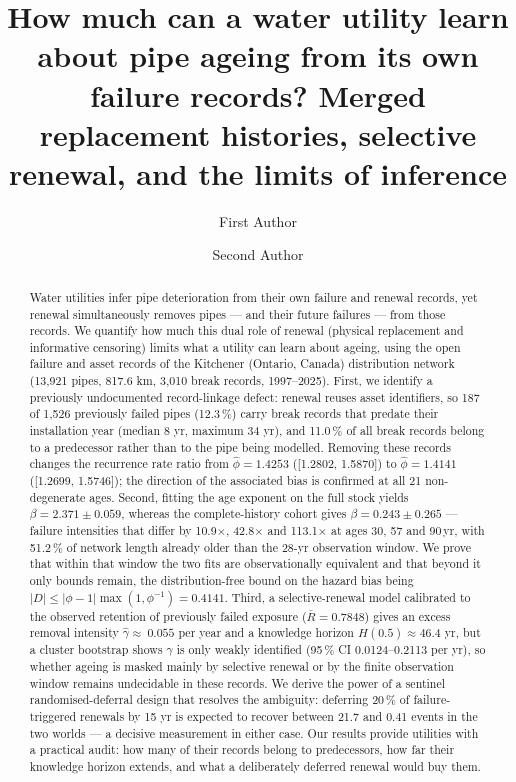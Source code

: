 \documentclass[review,12pt,authoryear]{elsarticle}
\begin{document}
\begin{frontmatter}

\title{How much can a water utility learn about pipe ageing from its own
failure records? Merged replacement histories, selective renewal, and the
limits of inference}

\author[a]{First Author}
\author[b]{Second Author}

\begin{abstract}
Water utilities infer pipe deterioration from their own failure and renewal
records, yet renewal simultaneously removes pipes --- and their future
failures --- from those records. We quantify how much this dual role of
renewal (physical replacement and informative censoring) limits what a
utility can learn about ageing, using the open failure and asset records of
the Kitchener (Ontario, Canada) distribution network (13,921 pipes,
817.6 km, 3,010 break records, 1997--2025). First, we identify a
previously undocumented record-linkage defect: renewal reuses asset
identifiers, so 187 of 1,526 previously failed pipes
(12.3\,\%) carry break records that predate their installation year
(median 8 yr, maximum 34 yr), and 11.0\,\% of all
break records belong to a predecessor rather than to the pipe being modelled.
Removing these records changes the recurrence rate ratio from
$\hat\phi = 1.4253$ ([1.2802, 1.5870]) to $\hat\phi = 1.4141$ ([1.2699, 1.5746]);
the direction of the associated bias is confirmed at all 21
non-degenerate ages. Second, fitting the age exponent on the full stock
yields $\beta = 2.371 \pm 0.059$, whereas the complete-history cohort
gives $\beta = 0.243 \pm 0.265$ --- failure intensities that differ by
10.9$\times$, 42.8$\times$ and 113.1$\times$ at ages 30, 57 and
90\,yr, with 51.2\,\% of network length already older than the 28-yr
observation window. We prove that within that window the two fits are
observationally equivalent and that beyond it only bounds remain, the
distribution-free bound on the hazard bias being
$|D| \le |\phi-1|\max(1,\phi^{-1}) = 0.4141$. Third, a selective-renewal
model calibrated to the observed retention of previously failed exposure
($\bar R = 0.7848$) gives an excess removal intensity
$\hat\gamma \approx ~0.055$ per year and a knowledge horizon
$H(0.5) \approx 46.4$ yr, but a cluster bootstrap shows $\gamma$ is only
weakly identified (95\,\% CI 0.0124--0.2113 per yr), so whether ageing
is masked mainly by selective renewal or by the finite observation window
remains undecidable in these records. We derive the power of a sentinel
randomised-deferral design that resolves the ambiguity: deferring 20\,\%
of failure-triggered renewals by 15 yr is expected to recover between
21.7 and 0.41 events in the two worlds --- a decisive measurement in
either case. Our results provide utilities with a practical audit: how many
of their records belong to predecessors, how far their knowledge horizon
extends, and what a deliberately deferred renewal would buy them.
\end{abstract}


\end{frontmatter}
\end{document}
